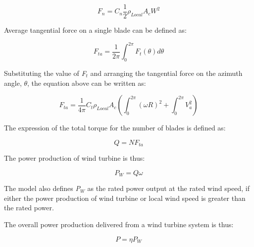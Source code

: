 \begin{equation}
{F_n} = {C_n}\frac{1}{2}{\rho_{Local}}{A_c}{W^2}
\end{equation}

Average tangential force on a single blade can be defined as:

\begin{equation}
{F_{ta}} = \frac{1}{{2\pi }}\int_0^{2\pi } {{F_t}(\theta )d\theta }
\end{equation}

Substituting the value of \emph{F\(_{t}\)} and arranging the tangential force on the azimuth angle, \(\theta\), the equation above can be written as:

\begin{equation}
{F_{ta}} = \frac{1}{{4\pi }}{C_t}{\rho_{Local}}{A_c}(\int_0^{2\pi } {{{(\omega R)}^2}}  + \int_0^{2\pi } {V_a^2} )
\end{equation}

The expression of the total torque for the number of blades is defined as:

\begin{equation}
Q = N{F_{ta}}
\end{equation}

The power production of wind turbine is thus:

\begin{equation}
{P_W} = Q\omega
\end{equation}

The model also defines \emph{P\(_{W}\)} as the rated power output at the rated wind speed, if either the power production of wind turbine or local wind speed is greater than the rated power.

The overall power production delivered from a wind turbine system is thus:

\begin{equation}
P = \eta {P_W}
\end{equation}

